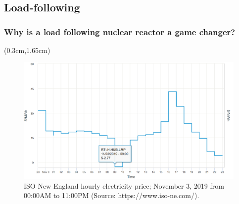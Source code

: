 \subsection{Load-following}
\begin{frame}
\frametitle{Why is a load following nuclear reactor a game changer?}
	\begin{textblock*}{12.1cm}(0.3cm,1.65cm) %
\begin{figure}[t]
	\includegraphics[width=\textwidth]{./images/ne_one_day_price.png}
		\vspace{-6mm}
	\caption{ISO New England hourly electricity price; November 3, 2019 
	from 00:00AM to 11:00PM (Source: https://www.iso-ne.com/).}
\end{figure}  
\end{textblock*}
\end{frame}

